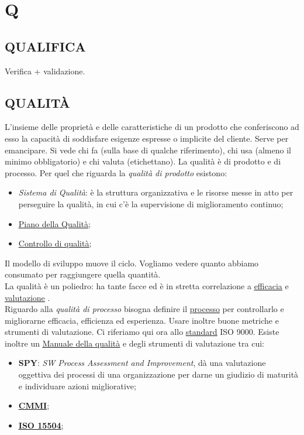 \newpage
	\flushright{\hyperref[index]{\color{black!65}{Ritorna all'indice}}}\flushleft
	\section{Q} \label{sec:Q}
	
		\subsection{QUALIFICA}  \label{qualifica}
		Verifica + validazione.  
	
		\subsection{QUALITÀ}  \label{qualita} %
		L’insieme delle proprietà e delle caratteristiche di un prodotto che conferiscono ad esso la capacità di soddisfare esigenze espresse o implicite del cliente. Serve per emancipare. Si vede chi fa (sulla base di qualche riferimento), chi usa (almeno il minimo obbligatorio) e chi valuta (etichettano).
		La qualità è di prodotto e di processo.
		Per quel che riguarda la \textit{qualità di prodotto} esistono:
		\begin{itemize}
			\item \textit{Sistema di Qualità}: è la struttura organizzativa e le risorse messe in atto per perseguire la qualità, in cui c'è la supervisione di miglioramento continuo;
			\item \underline{\hyperref[pianoqualita]{Piano della Qualità}};
			\item \underline{\hyperref[controlloqualita]{Controllo di qualità}};				
		\end{itemize}
		Il modello di sviluppo muove il ciclo. Vogliamo vedere quanto abbiamo consumato per raggiungere quella quantità. \\
		La qualità è un poliedro: ha tante facce ed è in stretta correlazione a \underline{\hyperref[efficacia]{efficacia}} e \underline{\hyperref[valutazione]{valutazione}} . \\
		Riguardo alla \textit{qualità di processo} bisogna definire il \underline{\hyperref[processo]{processo}} per controllarlo e migliorarne efficacia, efficienza ed esperienza. Usare inoltre buone metriche e strumenti di valutazione. Ci riferiamo qui ora allo \underline{\hyperref[standard]{standard}} ISO 9000. Esiste inoltre un \underline{\hyperref[manualequalita]{Manuale della qualità}} e degli strumenti di valutazione tra cui:
		\begin{itemize}
			\item \textbf{SPY}: \textit{SW Process Assessment and Improvement}, dà una valutazione oggettiva dei processi di una organizzazione per darne un giudizio di maturità e individuare azioni migliorative;
			\item \textbf{\underline{\hyperref[cmmi]{CMMI}}};
			\item \textbf{\underline{\hyperref[15504]{ISO 15504}}};
		\end{itemize}
	
	
